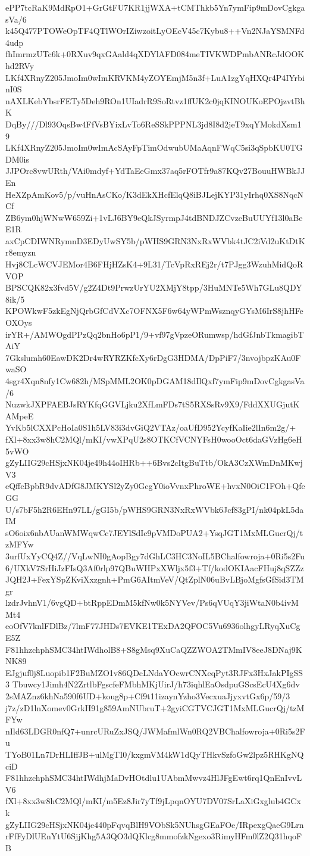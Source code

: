 ePP7tcRaK9MdRpO1+GrGtFU7KR1jjWXA+tCMThkb5Yn7ymFip9mDovCgkgasVa/6
k45Q477PTOWeOpTF4QTlWOrIZiwzoitLyOEcV45c7Kybu8++Vn2NJaYSMNFd4udp
fhImrmzUTc6k+0RXuv9qxGAald4qXDYlAFD084meTIVKWDPmbANRcJdOOKhd2RVy
LKf4XRnyZ205JmoIm0wImKRVKM4yZOYEmjM5n3f+LuA1zgYqHXQr4P4IYrbinI0S
nAXLKebYbsrFETy5Deh9ROn1UIadrR9SoRtvz1ffUK2c0jqKINOUKoEPOjzvtBhK
DqBy///Dl93OqsBw4FfVsBYixLvTo6ReSSkPPPNL3jd8I8d2jeT9xqYMokdXsm19
LKf4XRnyZ205JmoIm0wImAcSAyFpTimOdwubUMaAqnFWqC5si3qSpbKU0TGDM0is
JJPOrc8vwURth/VAi0mdyf+YdTaEeGmx37aq5rFOTfr9a87KQv27BouuHWBkJJEn
HeXZpAmKov5/p/vuHnAsCKo/K3dEkXHcfElqQ8iBJLejKYP31yIrhq0XS8NqcNCf
ZB6ym0hjWNwW659Zi+1vLJ6BY9eQkJSyrmpJ4tdBNDJZCvzeBuUUYf13l0aBeE1R
axCpCDIWNRymnD3EDyUwSY5b/pWHS9GRN3NxRxWVbk4tJC2iVd2uKtDtKr8emyzn
Hvj8CLcWCVJEMor4B6FHjHZsK4+9L31/TcVpRxREj2r/t7PJgg3WzuhMidQoRVOP
BPSCQK82x3fvd5V/g2Z4Dt9PrwzUrYU2XMjY8tpp/3HuMNTe5Wh7GLu8QDY8ik/5
KPOWkwF5zkEgNjQrbGfCdVXc7OFNX5F6w64yWPmWsznqyGYsM6IrS8jhHFeOXOys
irYR+/AMWOgdPPzQq2bnHo6pP1/9+vf97gVpzeORumwsp/hdGfJnbTkmagibTAiY
7Gkslumh60EawDK2Dr4wRYRZKfcXy6rDgG3HDMA/DpPiF7/3nvojbpzKAu0FwaSO
4sgr4Xqn8nfy1Cw682h/MSpMML2OK0pDGAM18dIlQxf7ymFip9mDovCgkgasVa/6
NuzwkJXPFAEBJsRYKfqGGVLjku2XfLmFDs7tS5RXSsRv9X9/FddXXUGjutKAMpeE
YvKb5lCXXPcHoIa0S1h5LV83i3dvGiQ2VTAz/oaUfD952YcyfKaIie2lIn6m2g/+
fXl+8xx3w8hC2MQl/mKI/vwXPqU2s8OTKCfVCNYFsH0wooOct6daGVzHg6eH5vWO
gZyLIIG29cHSjxNK04je49h44oIHRb++6Bvs2cItgBuTtb/OkA3CzXWmDnMKwjV3
eQffcBpbR9dvADfG8JMKYSl2yZy0GcgY0ioVvnxPhroWE+hvxN0OiC1FOh+QfeGG
U/s7bF5h2R6EHn97LL/gGI5b/pWHS9GRN3NxRxWVbk6Jcf83gPI/nk04pkL5daIM
sO6oix6nbAUanWMWqwCc7JEYlSdIc9pVMDoPUA2+YsqJGT1MxMLGucrQj/tzMFYw
3urfUxYyCQ4Z//VqLwNI0gAopBgy7dGhLC3HC3NoIL5BChalfowroja+0Ri5s2Fu
6/UXkV7SrHiJzFIsQ3Af0rlp97QBuWHPxXWljx5f3+Tf/kodOKIAacFHuj8qSZZz
JQH2J+FexYSpZKviXxzgnh+PmG6AItmVeV/QtZplN06uBvLBjoMgfsGfSid3TMgr
lzdrJvhnV1/6vgQD+btRppEDmM5kfNw0k5NYVev/Ps6qVUqY3jiWtaN0b4ivMMt4
eoOfV7knlFDlBz/7lmF77JHDs7EVKE1TExDA2QFOC5Vu6936olhgyLRyqXuCgE5Z
F81hhzchphSMC34htIWdholB8+S8gMsq9XuCaQZZWOA2TMmIV8eeJ8DNaj9KNK89
EJgjuf0j8Luopib1F2BuMZO1v86QDcLNdaYOcwrCNXeqPyt3RJFx3HxJakPIgSS3
Tbuwcy1Jimh4N2ZrtlbFgscfeFMbhMKjUirJ/h73iqhlEaOsdpuGScsEcU4Xg6dv
2sMAZnz6khNa590f6UD+koug8p+Cf9t11izaynYzho3VecxuaJjyxvtGx6p/59/3
j7z/zD1lnXomev0GrkH91g859AmNUbruT+2gyiCGTVCJGT1MxMLGucrQj/tzMFYw
nIld63LDGR0nfQ7+unrcURuZxJSQ/JWMafmlWn0RQ2VBChalfowroja+0Ri5s2Fu
TYoB01Ln7DrHLIffJB+ulMgTI0/kxgmVM4kW1dQyTHkvSzfoGw2lpz5RHKgNQciD
F81hhzchphSMC34htIWdhjMaDvHOtdlu1UAbmMwvz4HlJFgEwt6rq1QnEnIvvLV6
fXl+8xx3w8hC2MQl/mKI/m5Ez8Jir7yTf9jLpqnOYU7DV07SrLaXiGxglub4GCxk
gZyLIIG29cHSjxNK04je440pFqvqBlH9VObSk5NUhsgGEaFOe/IRpexgQaeG9Lrn
rFfFyDlUEnYtU6SjjKhg5A3QO3dQKlcg8mmofzkNgexo3RimyHFm0lZ2Q31hqoFB
